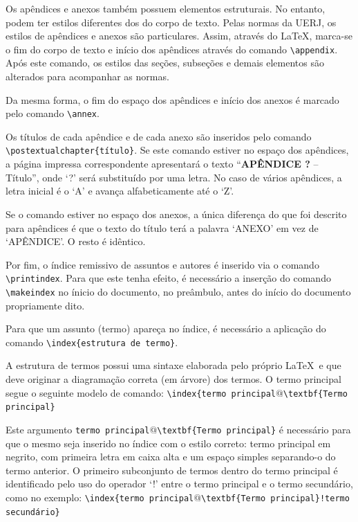 \documentclass[a4paper,12pt,oneside,onecolumn,final,fleqn]{repUERJ}
\begin{document}
Os apêndices e anexos também possuem elementos estruturais. No entanto, podem ter estilos diferentes dos do corpo de texto. Pelas normas da UERJ, os estilos de apêndices e anexos são particulares. Assim, através do \textsf{LaTeX}, marca-se o fim do corpo de texto e início dos apêndices através do comando \texttt{\textbackslash appendix}. Após este comando, os estilos das seções, subseções e demais elementos são alterados para acompanhar as normas.

Da mesma forma, o fim do espaço dos apêndices e início dos anexos é marcado pelo comando \texttt{\textbackslash annex}.

Os títulos de cada apêndice e de cada anexo são inseridos pelo comando \texttt{\textbackslash postex\-tualchapter\{título\}}. Se este comando estiver no espaço dos apêndices, a página impressa correspondente apresentará o texto ``\textbf{APÊNDICE ?} -- Título'', onde `?' será substituído por uma letra. No caso de vários apêndices, a letra inicial é o `A' e avança alfabeticamente até o `Z'.

Se o comando estiver no espaço dos anexos, a única diferença do que foi descrito para apêndices é que o texto do título terá a palavra `ANEXO' em vez de `APÊNDICE'. O resto é idêntico.

Por fim, o índice remissivo de assuntos e autores é inserido via o comando \texttt{\textbackslash printindex}. Para que este tenha efeito, é necessário a inserção do comando \texttt{\textbackslash makeindex} no ínicio do documento, no preâmbulo, antes do início do documento propriamente dito.

Para que um assunto (termo) apareça no índice, é necessário a aplicação do comando \texttt{\textbackslash index\{estrutura de termo\}}.

A estrutura de termos possui uma sintaxe elaborada pelo próprio \LaTeX\ e que deve originar a diagramação correta (em árvore) dos termos. O termo principal segue o seguinte modelo de comando: \texttt{\textbackslash index\{termo principal$@$\textbackslash textbf\{Termo principal\}}

Este argumento \texttt{termo principal$@$\textbackslash textbf\{Termo principal\}} é necessário para que o mesmo seja inserido no índice com o estilo correto: termo principal em negrito, com primeira letra em caixa alta e um espaço simples separando-o do termo anterior. O primeiro subconjunto de termos dentro do termo principal é identificado pelo uso do operador `!' entre o termo principal e o termo secundário, como no exemplo: \texttt{\textbackslash index\{termo principal$@$\textbackslash textbf\{Termo principal\}!termo secundário\}}
\end{document}
